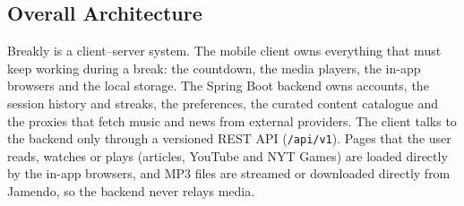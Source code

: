 \subsection{Overall Architecture}
\label{sec:overall-architecture}

Breakly is a client--server system. The mobile client owns everything that
must keep working during a break: the countdown, the media players, the
in-app browsers and the local storage. The Spring Boot backend owns accounts,
the session history and streaks, the preferences, the curated content
catalogue and the proxies that fetch music and news from external providers.
The client talks to the backend only through a versioned REST API
(\texttt{/api/v1}). Pages that the user reads, watches or plays (articles,
YouTube and NYT Games) are loaded directly by the in-app browsers, and MP3
files are streamed or downloaded directly from Jamendo, so the backend never
relays media.

